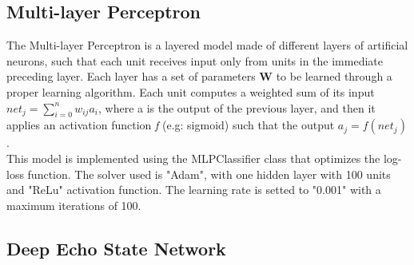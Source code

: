 \documentclass[10.5pt]{article}
\begin{document}
\begin{multicols*}{2}
\subsection{Multi-layer Perceptron}
The Multi-layer Perceptron is a layered model made of different layers of artificial neurons, such that each unit receives input only from units in the immediate preceding layer. Each layer has a set of parameters \textbf{W} to be learned through a proper learning algorithm. Each unit computes a weighted sum of its input $net_{j}=\sum_{i=0}^nw_{ij}a_{i}$, where a is the output of the previous layer, and then it applies an activation function \textit{f} (e.g: sigmoid) such that the output $a_{j}=f(net_{j})$. \cite{Multilayer}\\
This model is implemented using the MLPClassifier class that optimizes the log-loss function. The solver used is "Adam", with one hidden layer with 100 units and "ReLu" activation function. The learning rate is setted to "0.001" with a maximum iterations of 100.

\subsection{Deep Echo State Network}


\end{multicols*}
\end{document}
